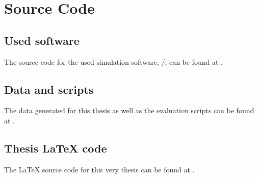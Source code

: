 \chapter{Source Code}
    \label{app:SourceCode}

    \section{Used software}
        The source code for the used simulation software, \ed/, can be found at \cite{Herbig2021EpiDynaST}.
    \section{Data and scripts}
        The data generated for this thesis as well as the evaluation scripts can be found at \cite{Krecké2021}.
    \section{Thesis \LaTeX{} code}
        The \LaTeX{} source code for this very thesis can be found at \cite{Krecké2021Thesis}.
%
%




